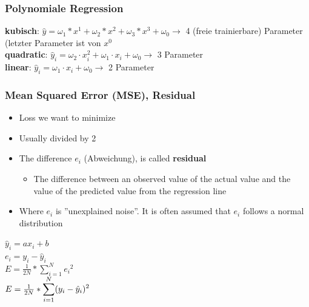 \subsubsection{Polynomiale Regression}


\textbf{kubisch}: $\hat{y} = \omega_1*x^1 + \omega_2*x^2 + \omega_3*x^3 + \omega_0 \rightarrow$ 4 (freie trainierbare) Parameter (letzter Parameter ist von $x^0$\\
\textbf{quadratic}: $\hat{y}_i = \omega_2 \cdot x_i^2 + \omega_1 \cdot x_i + \omega_0 \rightarrow$ 3 Parameter\\
\textbf{linear}: $\hat{y}_i = \omega_1 \cdot x_i + \omega_0 \rightarrow$ 2 Parameter\\

\subsubsection{Mean Squared Error (MSE), Residual}
\begin{itemize}
    \item Loss we want to minimize
    \item Usually divided by 2
    \item The difference $e_i$ (Abweichung), is called \textbf{residual}
    \begin{itemize}
        \item The difference between an observed value of the actual value and the value of the predicted value from the regression line
    \end{itemize}
    \item Where $e_i$ is ''unexplained noise''. It is often assumed that $e_i$ follows a normal distribution
\end{itemize}
\begin{center}
    $\hat{y}_i = ax_i + b$\\ 
    $e_i = y_i - \hat{y}_i$ \\ 
    
    $E = \frac{1}{2N} * \displaystyle\sum_{i = 1}^{N} {e_i}^2$\\
    $E = \frac{1}{2N} * \large\displaystyle\sum_{i = 1}^{N}(y_i - \hat{y}_i)^2$
\end{center}

